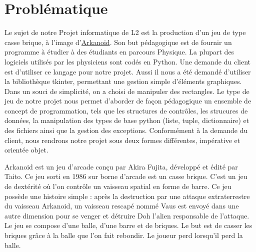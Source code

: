 \section{Problématique}

Le sujet de notre Projet informatique de L2 est la production d'un jeu de type casse brique, à  l'image d'\href{http://fr.wikipedia.org/wiki/Arkanoid}{Arkanoid}.
Son but pédagogique est de fournir un programme à étudier à des étudiants en parcours Physique.
La plupart des logiciels utilisés par les physiciens sont codés en Python. Une demande du client est d'utiliser ce langage pour notre projet.
Aussi il nous a été demandé d'utiliser la bibliothèque tkinter, permettant une gestion simple d'éléments graphiques. Dans un souci de simplicité, on a choisi de manipuler des rectangles. 
Le type de jeu de notre projet nous permet d'aborder de façon pédagogique un ensemble de concept de programmation, tels que
les structures de contrôles, les strucures de données, la manipulation des types de base python (liste, tuple, dictionnaire) et des fichiers ainsi que la gestion des exceptions.
Conformément à la demande du client, nous rendrons notre projet sous deux formes différentes, impérative et orientée objet.
                                   
Arkanoid est un jeu d'arcade conçu par Akira Fujita, développé et édité par Taito. Ce jeu sorti en 1986 sur borne d'arcade est un casse brique. C'est un jeu de dextérité où l'on contrôle un vaisseau spatial en forme de barre. Ce jeu possède une histoire simple : après la destruction par une attaque extraterrestre du vaisseau Arkanoid, un vaisseau rescapé nommé Vaus est envoyé dans une autre dimension pour se venger et détruire Doh l'alien responsable de l'attaque. 
Le jeu se compose d'une balle, d'une barre et de briques. Le but est de casser les briques grâce à la balle que l'on fait rebondir. Le joueur perd lorsqu'il perd la balle.
